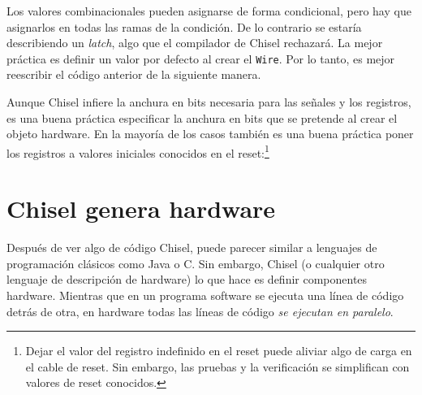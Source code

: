 \documentclass[%
    10pt,
    headinclude, footinclude=false,
    openright, %
    notitlepage,
    cleardoublepage=empty,
    headsepline,
    numbers=noenddot,
    bibliography=totoc, index=totoc,
    ]{scrbook}
\newcommand{\code}[1]{{\lstinline[basicstyle=\small\ttfamily]{#1}}}
\begin{document}
Los valores combinacionales pueden asignarse de forma condicional, pero hay que asignarlos en todas las
ramas de la condición. De lo contrario se estaría describiendo un \emph{latch}, algo que el compilador de
Chisel rechazará.
La mejor práctica es definir un valor por defecto al crear el \code{Wire}.
Por lo tanto, es mejor reescribir el código anterior de la siguiente manera.



\noindent Aunque Chisel infiere la anchura en bits necesaria para las señales y los registros, es una
buena práctica especificar la anchura en bits que se pretende al crear el objeto hardware.
En la mayoría de los casos también es una buena práctica poner los registros a valores iniciales conocidos en el
reset:\footnote{Dejar el valor del registro indefinido en el reset puede aliviar algo de carga en el cable de
reset. Sin embargo, las pruebas y la verificación se simplifican con valores de reset conocidos.}


\section{Chisel genera hardware}


Después de ver algo de código Chisel, puede parecer similar a lenguajes de programación
clásicos como Java o C. Sin embargo, Chisel (o cualquier otro lenguaje de descripción de
hardware) lo que hace es definir componentes hardware. Mientras que en un programa software se
ejecuta una línea de código detrás de otra, en hardware todas las líneas de código
\emph{se ejecutan en paralelo}.
\end{document}
